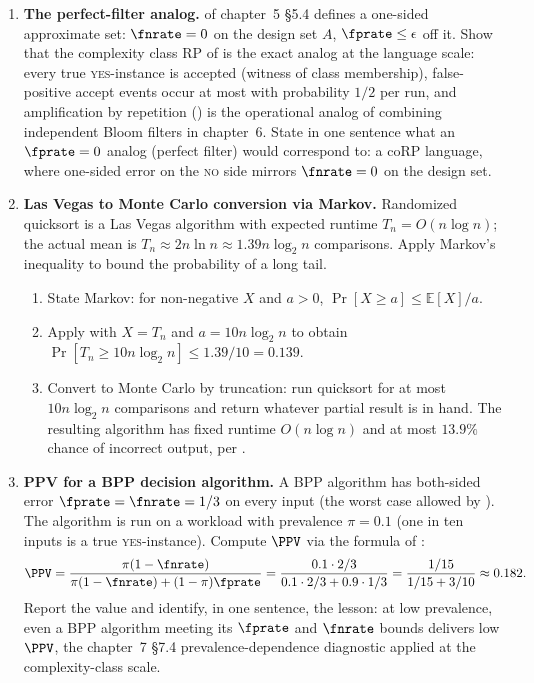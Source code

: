\begin{enumerate}
\item \exstarstar
\label{ex:ch11-6}
\textbf{The perfect-filter analog.}
 of chapter~5 \S5.4 defines a one-sided
approximate set: $\fnrate = 0$ on the design set $A$, $\fprate
\le \epsilon$ off it. Show that the complexity class $\mathrm{RP}$
of  is the exact analog at the language scale: every
true \textsc{yes}-instance is accepted (witness of class
membership), false-positive accept events occur at most with
probability $1/2$ per run, and amplification by repetition
() is the operational analog of
combining independent Bloom filters in chapter~6. State in one
sentence what an $\fprate = 0$ analog (perfect filter) would
correspond to: a $\mathrm{coRP}$ language, where one-sided error
on the \textsc{no} side mirrors $\fnrate = 0$ on the design set.

\item \exstarstar
\label{ex:ch11-7}
\textbf{Las Vegas to Monte Carlo conversion via Markov.}
Randomized quicksort is a Las Vegas algorithm with expected
runtime $T_n = O(n \log n)$; the actual mean is $T_n \approx 2 n
\ln n \approx 1.39 n \log_2 n$ comparisons. Apply Markov's
inequality to bound the probability of a long tail.
\begin{enumerate}
  \item[(a)] State Markov: for non-negative $X$ and $a > 0$,
    $\Pr[X \ge a] \le \mathbb{E}[X] / a$.
  \item[(b)] Apply with $X = T_n$ and $a = 10 n \log_2 n$ to
    obtain $\Pr[T_n \ge 10 n \log_2 n] \le 1.39 / 10 = 0.139$.
  \item[(c)] Convert to Monte Carlo by truncation: run quicksort
    for at most $10 n \log_2 n$ comparisons and return whatever
    partial result is in hand. The resulting algorithm has fixed
    runtime $O(n \log n)$ and at most $13.9\%$ chance of incorrect
    output, per .
\end{enumerate}

\item \exstarstar
\label{ex:ch11-8}
\textbf{PPV for a BPP decision algorithm.}
A BPP algorithm has both-sided error $\fprate = \fnrate = 1/3$
on every input (the worst case allowed by ).
The algorithm is run on a workload with prevalence $\pi = 0.1$
(one in ten inputs is a true \textsc{yes}-instance). Compute
$\PPV$ via the formula of :
\[
  \PPV = \frac{\pi (1 - \fnrate)}{\pi (1 - \fnrate) + (1 - \pi) \fprate}
       = \frac{0.1 \cdot 2/3}{0.1 \cdot 2/3 + 0.9 \cdot 1/3}
       = \frac{1/15}{1/15 + 3/10}
       \approx 0.182.
\]
Report the value and identify, in one sentence, the lesson: at
low prevalence, even a BPP algorithm meeting its $\fprate$ and
$\fnrate$ bounds delivers low $\PPV$, the chapter~7 \S7.4
prevalence-dependence diagnostic applied at the complexity-class
scale.


\end{enumerate}
